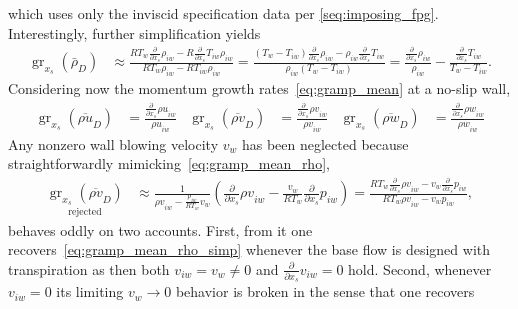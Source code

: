 \documentclass[letterpaper,11pt,nointlimits,reqno,draft]{amsbook}
\begin{document}
which uses only the inviscid specification data per \autoref{seq:imposing_fpg}.
Interestingly, further simplification yields
\begin{align}
    \label{eq:gramp_mean_rho_simp}
    \operatorname{gr}_{x_s}\!\left(\bar{\rho}_{D}\right)
    &\approx
    \frac{
          R T_w \frac{\partial}{\partial x_s}        \rho_{iw}
        - R     \frac{\partial}{\partial x_s} T_{iw} \rho_{iw}
    }{
          R T_w \rho_{iw} - R T_{iw} \rho_{iw}
    }
    =
    \frac{
          \left( T_w - T_{iw} \right) \frac{\partial}{\partial x_s} \rho_{iw}
        - \rho_{iw} \frac{\partial}{\partial x_s} T_{iw}
    }{
          \rho_{iw} \left( T_w - T_{iw} \right)
    }
    = \frac{ \frac{\partial}{\partial x_s} \rho_{iw} } { \rho_{iw} }
    - \frac{\frac{\partial}{\partial x_s} T_{iw} }{T_w - T_{iw}}
    .
\end{align}
%
Considering now the momentum growth rates~\eqref{eq:gramp_mean} at a no-slip
wall,
\begin{align}
    \operatorname{gr}_{x_s}\!\left(\overline{\rho u}_{D}\right)
    &=
    \frac{ \frac{\partial}{\partial x_s} {\rho u}_{iw} }{ {\rho u}_{iw} }
    &
    \operatorname{gr}_{x_s}\!\left(\overline{\rho v}_{D}\right)
    &=
    \frac{ \frac{\partial}{\partial x_s} {\rho v}_{iw} }{ {\rho v}_{iw} }
    &
    \operatorname{gr}_{x_s}\!\left(\overline{\rho w}_{D}\right)
    &=
    \frac{ \frac{\partial}{\partial x_s} {\rho w}_{iw} }{ {\rho w}_{iw} }
\end{align}
Any nonzero wall blowing velocity $v_w$ has been neglected because
straightforwardly mimicking~\eqref{eq:gramp_mean_rho},
\begin{align}
    \label{eq:gramp_mean_rhov_alt}
    \underset{\text{rejected}}
             {\operatorname{gr}_{x_s}\!\left(\overline{\rho v}_{D}\right)}
    &\approx
    \frac{1}{{\rho v}_{iw} - \frac{p_{iw}}{R T_w} v_w}
    \left(
          \frac{\partial}{\partial x_s}         {\rho v}_{iw}
        - \frac{v_w}{R T_w} \frac{\partial}{\partial x_s} {p}_{iw}
    \right)
    =
    \frac{
          R T_w \frac{\partial}{\partial x_s} {\rho v}_{iw}
        -   v_w \frac{\partial}{\partial x_s} {p     }_{iw}
    }{
        R T_w {\rho v}_{iw} - v_w p_{iw}
    }
    ,
\end{align}
behaves oddly on two accounts.  First, from it one
recovers~\eqref{eq:gramp_mean_rho_simp} whenever the base flow is designed with
transpiration as then both $v_{iw} = v_w \neq 0$ and $\frac{\partial}{\partial
x_s} v_{iw} = 0$ hold.  Second, whenever $v_{iw} = 0$ its limiting $v_w \to 0$
behavior is broken in the sense that one recovers
\end{document}
